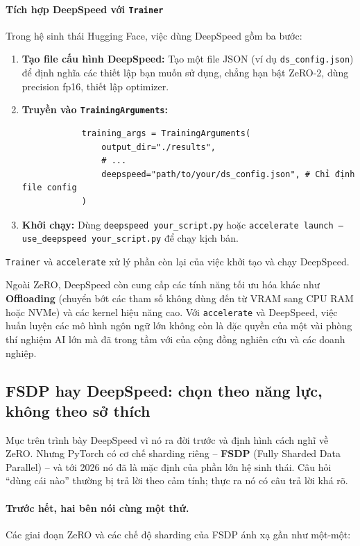 \paragraph{Tích hợp DeepSpeed với \texttt{Trainer}}
Trong hệ sinh thái Hugging Face, việc dùng DeepSpeed gồm ba bước:
\begin{enumerate}
    \item \textbf{Tạo file cấu hình DeepSpeed:} Tạo một file JSON (ví dụ \texttt{ds\_config.json}) để định nghĩa các thiết lập bạn muốn sử dụng, chẳng hạn bật ZeRO-2, dùng precision fp16, thiết lập optimizer.
    \item \textbf{Truyền vào \texttt{TrainingArguments}:}
            \begin{verbatim}
            training_args = TrainingArguments(
                output_dir="./results",
                # ...
                deepspeed="path/to/your/ds_config.json", # Chỉ định file config
            )
            \end{verbatim}
    \item \textbf{Khởi chạy:} Dùng \texttt{deepspeed your\_script.py} hoặc \texttt{accelerate launch --use\_deepspeed your\_script.py} để chạy kịch bản.
\end{enumerate}
\texttt{Trainer} và \texttt{accelerate} xử lý phần còn lại của việc khởi tạo và chạy DeepSpeed.

Ngoài ZeRO, DeepSpeed còn cung cấp các tính năng tối ưu hóa khác như \textbf{Offloading} (chuyển bớt các tham số không dùng đến từ VRAM sang CPU RAM hoặc NVMe) và các kernel hiệu năng cao. Với \texttt{accelerate} và DeepSpeed, việc huấn luyện các mô hình ngôn ngữ lớn không còn là đặc quyền của một vài phòng thí nghiệm AI lớn mà đã trong tầm với của cộng đồng nghiên cứu và các doanh nghiệp.


\subsection{FSDP hay DeepSpeed: chọn theo năng lực, không theo sở thích}
\label{sec:fsdp_vs_deepspeed}

Mục trên trình bày DeepSpeed vì nó ra đời trước và định hình cách nghĩ về ZeRO. Nhưng PyTorch có cơ chế sharding riêng -- \textbf{FSDP} (Fully Sharded Data Parallel) -- và tới 2026 nó đã là mặc định của phần lớn hệ sinh thái. Câu hỏi “dùng cái nào” thường bị trả lời theo cảm tính; thực ra nó có câu trả lời khá rõ.

\paragraph{Trước hết, hai bên nói cùng một thứ.} Các giai đoạn ZeRO và các chế độ sharding của FSDP ánh xạ gần như một-một:

